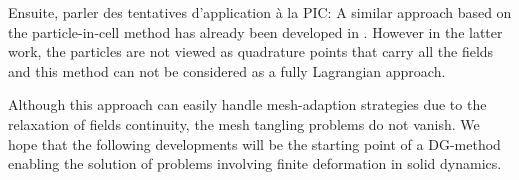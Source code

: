 Ensuite, parler des tentatives d'application à la PIC: 
A similar approach based on the particle-in-cell method has already been developed in \cite{DGPIC_maxwell}. However in the latter work, the particles are not viewed as quadrature points that carry all the fields and this method can not be considered as a fully Lagrangian approach.

Although this approach can easily handle mesh-adaption strategies due to the relaxation of fields continuity, the mesh tangling problems do not vanish. We hope that the following developments will be the starting point of a DG-method enabling the solution of problems involving finite deformation in solid dynamics. 






